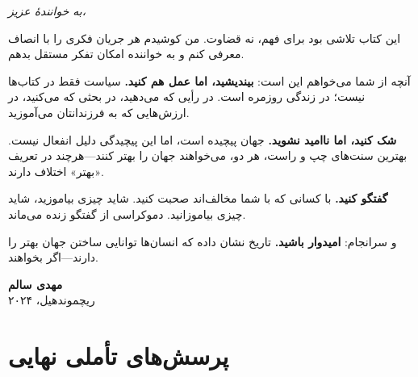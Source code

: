 \begin{tcolorbox}[
    enhanced,
    colback=violet!10,
    colframe=violet,
    boxrule=2pt,
    arc=10pt,
    fonttitle=\bfseries\large,
    title={\rl{✍️ پیام نویسنده}}
]
\begin{center}
\textit{به خوانندهٔ عزیز،}
\end{center}

این کتاب تلاشی بود برای فهم، نه قضاوت. من کوشیدم هر جریان فکری را با انصاف معرفی کنم و به خواننده امکان تفکر مستقل بدهم.

آنچه از شما می‌خواهم این است: \textbf{بیندیشید، اما عمل هم کنید.} سیاست فقط در کتاب‌ها نیست؛ در زندگی روزمره است. در رأیی که می‌دهید، در بحثی که می‌کنید، در ارزش‌هایی که به فرزندانتان می‌آموزید.

\textbf{شک کنید، اما ناامید نشوید.} جهان پیچیده است، اما این پیچیدگی دلیل انفعال نیست. بهترین سنت‌های چپ و راست، هر دو، می‌خواهند جهان را بهتر کنند—هرچند در تعریف «بهتر» اختلاف دارند.

\textbf{گفتگو کنید.} با کسانی که با شما مخالف‌اند صحبت کنید. شاید چیزی بیاموزید، شاید چیزی بیاموزانید. دموکراسی از گفتگو زنده می‌ماند.

و سرانجام: \textbf{امیدوار باشید.} تاریخ نشان داده که انسان‌ها توانایی ساختن جهان بهتر را دارند—اگر بخواهند.

\vspace{5mm}
\begin{flushright}
\textbf{مهدی سالم}\\
ریچموندهیل، ۲۰۲۴
\end{flushright}
\end{tcolorbox}

\section*{پرسش‌های تأملی نهایی}

